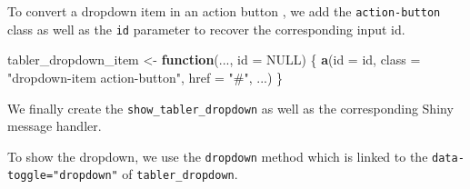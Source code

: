 \documentclass[
]{book}
\newenvironment{Shaded}{\begin{snugshade}}{\end{snugshade}}
\newcommand{\AttributeTok}[1]{\textcolor[rgb]{0.77,0.63,0.00}{#1}}
\newcommand{\ControlFlowTok}[1]{\textcolor[rgb]{0.13,0.29,0.53}{\textbf{#1}}}
\newcommand{\DataTypeTok}[1]{\textcolor[rgb]{0.13,0.29,0.53}{#1}}
\newcommand{\KeywordTok}[1]{\textcolor[rgb]{0.13,0.29,0.53}{\textbf{#1}}}
\newcommand{\NormalTok}[1]{#1}
\newcommand{\OperatorTok}[1]{\textcolor[rgb]{0.81,0.36,0.00}{\textbf{#1}}}
\newcommand{\OtherTok}[1]{\textcolor[rgb]{0.56,0.35,0.01}{#1}}
\newcommand{\SpecialCharTok}[1]{\textcolor[rgb]{0.00,0.00,0.00}{#1}}
\newcommand{\StringTok}[1]{\textcolor[rgb]{0.31,0.60,0.02}{#1}}
\newcommand{\VariableTok}[1]{\textcolor[rgb]{0.00,0.00,0.00}{#1}}
\newcommand{\VerbatimStringTok}[1]{\textcolor[rgb]{0.31,0.60,0.02}{#1}}
\begin{document}
To convert a dropdown item in an action button , we add the \texttt{action-button} class as well as the \texttt{id} parameter to recover the corresponding input id.

\begin{Shaded}
\begin{Highlighting}[]
\NormalTok{tabler_dropdown_item <-}\StringTok{ }\ControlFlowTok{function}\NormalTok{(..., }\DataTypeTok{id =} \OtherTok{NULL}\NormalTok{) \{}
  \KeywordTok{a}\NormalTok{(}\DataTypeTok{id =}\NormalTok{ id, }\DataTypeTok{class =} \StringTok{"dropdown-item action-button"}\NormalTok{, }\DataTypeTok{href =} \StringTok{"#"}\NormalTok{, ...)}
\NormalTok{\}}
\end{Highlighting}
\end{Shaded}

We finally create the \texttt{show\_tabler\_dropdown} as well as the corresponding Shiny message handler.

\begin{Shaded}
\end{Shaded}

To show the dropdown, we use the \texttt{dropdown} method which is linked to the \texttt{data-toggle="dropdown"} of \texttt{tabler\_dropdown}.

\begin{Shaded}
\end{Shaded}
\end{document}
